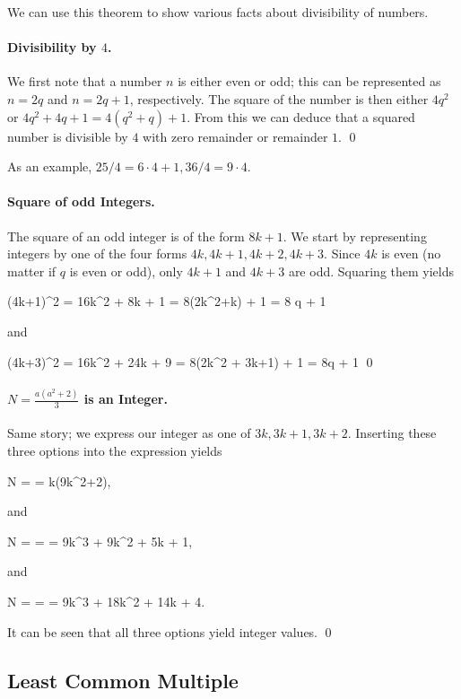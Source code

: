 We can use this theorem to show various facts about divisibility of numbers.

\paragraph{Divisibility by $4$.} We first note that a number $n$ is either even or odd; this can be represented as $n = 2q$ and $n = 2q+1$, respectively. The square of the number is then either $4q^2$ or $4q^2 + 4q + 1 = 4(q^2+q) + 1$. From this we can deduce that a squared number is divisible by $4$ with zero remainder or remainder $1$. \qed

As an example, $25 / 4 = 6 \cdot 4 + 1, 36 / 4 = 9 \cdot 4$.

\paragraph{Square of odd Integers.} The square of an odd integer is of the form $8k+1$. We start by representing integers by one of the four forms $4k, 4k+1, 4k+2, 4k+3$. Since $4k$ is even (no matter if $q$ is even or odd), only $4k+1$ and $4k+3$ are odd. Squaring them yields

\bee
(4k+1)^2 = 16k^2 + 8k + 1 = 8(2k^2+k) + 1 = 8 q + 1
\eee

and

\bee
(4k+3)^2 = 16k^2 + 24k + 9 = 8(2k^2 + 3k+1) + 1 = 8q + 1 \qed
\eee

\paragraph{$N = \frac{a(a^2+2)}{3}$ is an Integer.} Same story; we express our integer as one of $3k, 3k+1, 3k+2$. Inserting these three options into the expression yields

\bee
N =  = k(9k^2+2),
\eee

and

\bee
N =  =  = 9k^3 + 9k^2 + 5k + 1,
\eee

and

\bee
N =  =  = 9k^3 + 18k^2 + 14k + 4.
\eee

It can be seen that all three options yield integer values. \qed

\subsection{Least Common Multiple}

